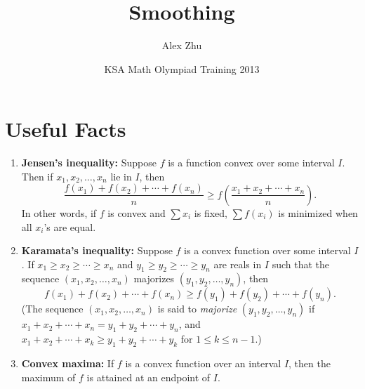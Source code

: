 \documentclass[11pt]{article}
\begin{document}
 

\title{Smoothing}
\author{Alex Zhu}
\date{KSA Math Olympiad Training 2013}

\maketitle

\section{Useful Facts}
\begin{enumerate}
  \item \textbf{Jensen's inequality:} Suppose $f$ is a function convex over some interval $I$. Then if $x_1, x_2, \ldots, x_n$ lie in $I$, then \[ \frac{f(x_1) + f(x_2) + \cdots + f(x_n)}{n} \geq f \left( \frac{x_1 + x_2 + \cdots + x_n}{n} \right). \] In other words, if $f$ is convex and $\sum x_i$ is fixed, $\sum f(x_i)$ is minimized when all $x_i$'s are equal. 
  \item \textbf{Karamata's inequality:} Suppose $f$ is a convex function over some interval $I$. If $x_1 \geq x_2 \geq \cdots \geq x_n$ and $y_1 \geq y_2 \geq \cdots \geq y_n$ are reals in $I$ such that the sequence $(x_1, x_2, \ldots, x_n)$ majorizes $(y_1, y_2, \ldots, y_n)$, then \[ f(x_1) + f(x_2) + \cdots + f(x_n) \geq f(y_1) + f(y_2) + \cdots + f(y_n). \] 
  (The sequence $(x_1, x_2, \ldots, x_n)$ is said to \emph{majorize} $(y_1, y_2, \ldots, y_n)$ if $x_1 + x_2 + \cdots + x_n = y_1 + y_2 + \cdots + y_n$, and $x_1 + x_2 + \cdots + x_k \geq y_1 + y_2 + \cdots + y_k$ for $1 \leq k \leq n-1$.)
  \item \textbf{Convex maxima:} If $f$ is a convex function over an interval $I$, then the maximum of $f$ is attained at an endpoint of $I$. 
\end{enumerate}
\end{document}
